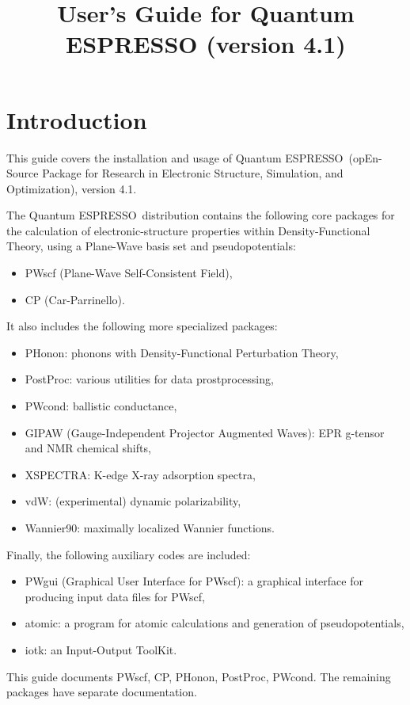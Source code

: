 \documentclass[12pt,a4paper]{article}
\def\version{4.1}
\def\qe{{\sc Quantum ESPRESSO}}
\begin{document}
 
\author{}
\date{}
\title{
 \hskip 2cm
 \vskip 1cm
  \Huge User's Guide for \qe \smallskip
  \Large (version \version)
}
\maketitle

\tableofcontents

\section{Introduction}

This guide covers the installation and usage of \qe\ (opEn-Source 
Package for Research in Electronic Structure, Simulation,
and Optimization), version \version.

The \qe\ distribution contains the following core packages 
for the calculation of electronic-structure properties within
Density-Functional Theory, using a Plane-Wave basis set and pseudopotentials:
\begin{itemize}
  \item PWscf (Plane-Wave Self-Consistent Field),
  \item CP (Car-Parrinello).
\end{itemize}
It also includes the following more specialized packages:
\begin{itemize}
  \item PHonon:
        phonons with Density-Functional Perturbation Theory,
  \item PostProc: various utilities for data prostprocessing,
  \item PWcond:
        ballistic conductance,
  \item GIPAW  (Gauge-Independent Projector Augmented Waves):
        EPR g-tensor and NMR chemical shifts,
  \item XSPECTRA:
        K-edge X-ray adsorption spectra,
  \item vdW:
        (experimental) dynamic polarizability, 
  \item Wannier90:
        maximally localized Wannier functions.
\end{itemize}
Finally, the following auxiliary codes are included:
\begin{itemize}
\item PWgui (Graphical User Interface for PWscf): 
      a graphical interface for producing input data files for PWscf,
\item atomic: 
      a program for atomic calculations and generation of pseudopotentials,
\item iotk:
      an Input-Output ToolKit.
\end{itemize}
This guide documents PWscf, CP, PHonon, PostProc, PWcond. 
The remaining packages have separate documentation.
\end{document}
